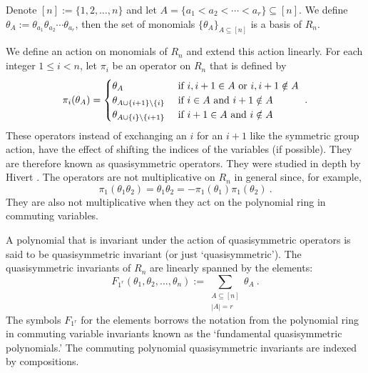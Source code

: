 \documentclass[submission]{FPSAC2023}
\theoremstyle{definition}
\numberwithin{equation}{section}
\begin{document}
Denote $[n] := \{1,2, \ldots,n\}$ and
let $A = \{a_1 < a_2 < \cdots < a_r \} \subseteq [n]$.
We define $\theta_A := \theta_{a_1} \theta_{a_2} \cdots \theta_{a_r}$,
then the set of monomials $\{ \theta_A \}_{A \subseteq [n]}$ is a basis of $R_n$.

We define an action on monomials of $R_n$ and extend this action linearly.
For each integer $1 \leq i < n$, let $\pi_i$ be an operator on $R_n$
that is defined by
\begin{equation}\label{eq:pi}
\pi_i(\theta_A) = \begin{cases}
\theta_{A} & \hbox{ if } i, i+1 \in A\hbox{ or }i, i+1 \notin A\\
\theta_{A \cup \{i+1\} \backslash \{i\}} & \hbox{ if } i\in A\hbox{ and }i+1 \notin A\\
\theta_{A \cup \{i\} \backslash \{i+1\}} & \hbox{ if } i+1\in A\hbox{ and }i \notin A
\end{cases}~.
\end{equation}
These operators instead of exchanging an $i$ for an $i+1$ like the symmetric group
action, have the effect of shifting the indices of the variables (if possible).  They
are therefore known as quasisymmetric operators.  They were studied in depth by
Hivert \cite{Hi}.  The operators are not multiplicative on $R_n$ in general since, for example,
\[
\pi_1( \theta_{1} \theta_{2})
= \theta_1 \theta_2
= - \pi_1( \theta_{1}) \pi_1(\theta_{2})~.
\]
They are also not multiplicative when they act on the polynomial ring
in commuting variables.

A polynomial that is invariant under the action of quasisymmetric operators
is said to be quasisymmetric invariant (or just `quasisymmetric').
The quasisymmetric invariants of $R_n$ are
linearly spanned by the elements:
\begin{equation}\label{eq:defF}
F_{1^r}(\theta_1, \theta_2, \ldots, \theta_n) := \sum_{\substack{A \subseteq [n]\\|A|=r}} \theta_A~.
\end{equation}
The symbols $F_{1^r}$ for the elements borrows the notation from the
polynomial ring in commuting variable invariants known as the `fundamental
quasisymmetric polynomials.'  The commuting polynomial quasisymmetric
invariants are indexed by compositions.

\end{document}
